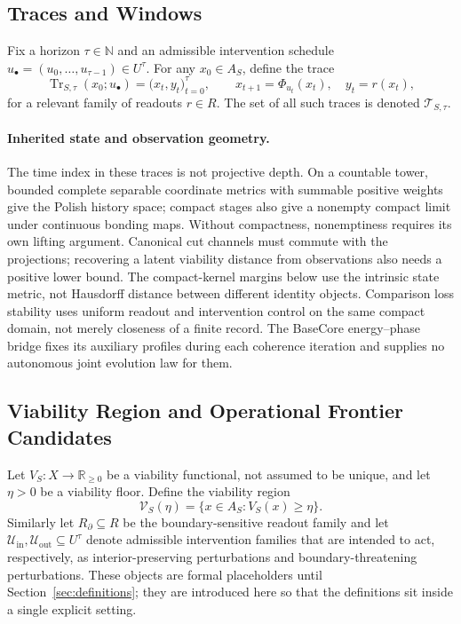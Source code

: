 \documentclass[11pt,a4paper]{article}
\theoremstyle{definition}
\newcommand{\Struct}{\mathscr{T}}
\newcommand{\Aset}{A_S}
\newcommand{\Vset}{\mathcal{V}_S}
\newcommand{\trace}{\operatorname{Tr}}
\begin{document}
\subsection{Traces and Windows}
Fix a horizon $\tau \in \mathbb{N}$ and an admissible intervention schedule $u_\bullet = (u_0,\ldots,u_{\tau-1}) \in U^\tau$. For any $x_0 \in \Aset$, define the trace
\[
\trace_{S,\tau}(x_0;u_\bullet)
=
\bigl(x_t,y_t\bigr)_{t=0}^{\tau},
\qquad
x_{t+1}=\Phi_{u_t}(x_t),\quad y_t = r(x_t),
\]
for a relevant family of readouts $r \in R$. The set of all such traces is denoted $\Struct_{S,\tau}$.

\paragraph{Inherited state and observation geometry.}
The time index in these traces is not projective depth. On a countable tower,
bounded complete separable coordinate metrics with summable positive weights
give the Polish history space; compact stages also give a nonempty compact
limit under continuous bonding maps. Without compactness, nonemptiness
requires its own lifting argument. Canonical cut channels must commute with
the projections; recovering a latent viability distance from observations
also needs a positive lower bound. The compact-kernel margins below use the
intrinsic state metric, not Hausdorff distance between different identity
objects. Comparison loss stability uses uniform readout and intervention
control on the same compact domain, not merely closeness of a finite record.
The BaseCore energy--phase bridge fixes its auxiliary profiles during each
coherence iteration and supplies no autonomous joint evolution law for them.

\subsection{Viability Region and Operational Frontier Candidates}
Let $V_S:X\to \mathbb{R}_{\ge 0}$ be a viability functional, not assumed to be unique, and let $\eta>0$ be a viability floor. Define the viability region
\[
\Vset(\eta)=\{x\in \Aset : V_S(x)\ge \eta\}.
\]
Similarly let $R_{\partial} \subseteq R$ be the boundary-sensitive readout family and let $\mathcal{U}_{\mathrm{in}},\mathcal{U}_{\mathrm{out}} \subseteq U^\tau$ denote admissible intervention families that are intended to act, respectively, as interior-preserving perturbations and boundary-threatening perturbations. These objects are formal placeholders until Section~\ref{sec:definitions}; they are introduced here so that the definitions sit inside a single explicit setting.
\end{document}
